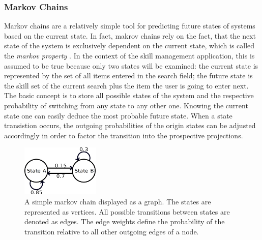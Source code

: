 \subsubsection{Markov Chains}
Markov chains are a relatively simple tool for predicting future states of systems based on the current state. In fact, makrov chains rely on the fact, that the next state of the system is exclusively dependent on the current state, which is called the \textit{markov property} \cite{markprop}. In the context of the skill management application, this is assumed to be true because only two states will be examined: the current state is represented by the set of all items entered in the search field; the future state is the skill set of the current search plus the item the user is going to enter next.
The basic concept is to store all possible states of the system and the respective probability of switching from any state to any other one.
Knowing the current state one can easily deduce the most probable future state. When a state transistion occurs, the outgoing probabilities of the origin states
can be adjusted accordingly in order to factor the transition into the prospective projections.
\begin{figure}[!htp]
    \centering
    \includegraphics[width=0.33\textwidth]{images/markov-chain.png}
    \caption[Diagram: Markov Chain]{A simple markov chain displayed as a graph. The states are represented as vertices. All possible transitions between states are denoted as edges. The edge weights define the probability of the transition relative to all other outgoing edges of a node.}
    \label{fig:markovchain}
\end{figure}

